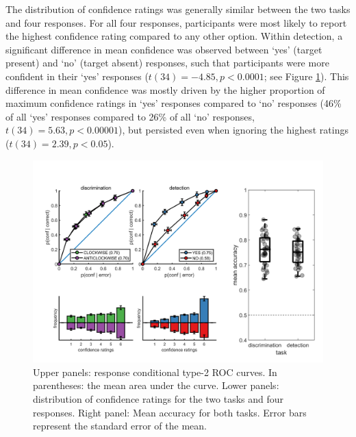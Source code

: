 \documentclass[12pt,twoside]{reedthesis}
\begin{document}
The distribution of confidence ratings was generally similar between the two tasks and four responses. For all four responses, participants were most likely to report the highest confidence rating compared to any other option. Within detection, a significant difference in mean confidence was observed between `yes' (target present) and `no' (target absent) responses, such that participants were more confident in their `yes' responses (\(t(34) = -4.85, p<0.0001\); see Figure \ref{fig:fMRI-exp1-behaviour}). This difference in mean confidence was mostly driven by the higher proportion of maximum confidence ratings in `yes' responses compared to `no' responses (46\% of all `yes' responses compared to 26\% of all `no' responses, \(t(34)=5.63, p<0.00001\)), but persisted even when ignoring the highest ratings (\(t(34)=2.39, p<0.05\)).
\begin{figure}
\includegraphics[width=\linewidth]{figure/fMRI/behaviour} \caption[Behavioural results, imaging experiment]{Upper panels: response conditional type-2 ROC curves. In parentheses: the mean area under the curve. Lower panels: distribution of confidence ratings for the two tasks and four responses. Right panel: Mean accuracy for both tasks. Error bars represent the standard error of the mean.}\label{fig:fMRI-exp1-behaviour}
\end{figure}
\end{document}

